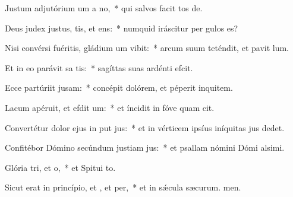 \item Justum adjutórium um a no,~* qui salvos facit tos de.
\item Deus judex justus, tis, et ens:~* numquid iráscitur per gulos es?
\item Nisi convérsi fuéritis, gládium um vibit:~* arcum suum teténdit, et pavit lum.
\item Et in eo parávit sa tis:~* sagíttas suas ardénti efcit.
\item Ecce partúriit jusam:~* concépit dolórem, et péperit inquitem.
\item Lacum apéruit, et efdit um:~* et íncidit in fóve quam cit.
\item Convertétur dolor ejus in put jus:~* et in vérticem ipsíus iníquitas jus dedet.
\item Confitébor Dómino secúndum justiam jus:~* et psallam nómini Dómi alsimi.
\item Glória tri, et o,~* et Spitui to.
\item Sicut erat in princípio, et , et per,~* et in sǽcula sæcurum. men.
